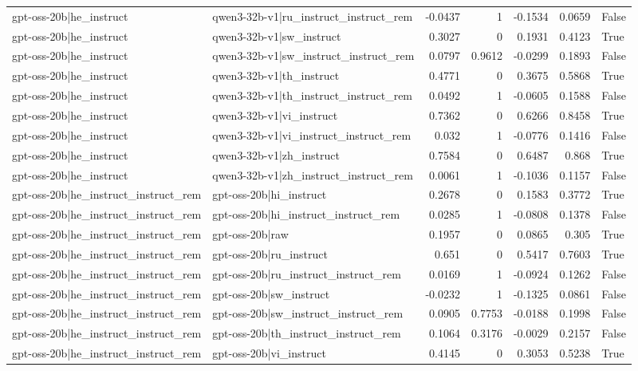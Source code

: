 \begin{table}
\begin{tabular}{l l r r r r l}
gpt-oss-20b|he_instruct & qwen3-32b-v1|ru_instruct_instruct_rem & -0.0437 & 1 & -0.1534 & 0.0659 & False \\
gpt-oss-20b|he_instruct & qwen3-32b-v1|sw_instruct & 0.3027 & 0 & 0.1931 & 0.4123 & True \\
gpt-oss-20b|he_instruct & qwen3-32b-v1|sw_instruct_instruct_rem & 0.0797 & 0.9612 & -0.0299 & 0.1893 & False \\
gpt-oss-20b|he_instruct & qwen3-32b-v1|th_instruct & 0.4771 & 0 & 0.3675 & 0.5868 & True \\
gpt-oss-20b|he_instruct & qwen3-32b-v1|th_instruct_instruct_rem & 0.0492 & 1 & -0.0605 & 0.1588 & False \\
gpt-oss-20b|he_instruct & qwen3-32b-v1|vi_instruct & 0.7362 & 0 & 0.6266 & 0.8458 & True \\
gpt-oss-20b|he_instruct & qwen3-32b-v1|vi_instruct_instruct_rem & 0.032 & 1 & -0.0776 & 0.1416 & False \\
gpt-oss-20b|he_instruct & qwen3-32b-v1|zh_instruct & 0.7584 & 0 & 0.6487 & 0.868 & True \\
gpt-oss-20b|he_instruct & qwen3-32b-v1|zh_instruct_instruct_rem & 0.0061 & 1 & -0.1036 & 0.1157 & False \\
gpt-oss-20b|he_instruct_instruct_rem & gpt-oss-20b|hi_instruct & 0.2678 & 0 & 0.1583 & 0.3772 & True \\
gpt-oss-20b|he_instruct_instruct_rem & gpt-oss-20b|hi_instruct_instruct_rem & 0.0285 & 1 & -0.0808 & 0.1378 & False \\
gpt-oss-20b|he_instruct_instruct_rem & gpt-oss-20b|raw & 0.1957 & 0 & 0.0865 & 0.305 & True \\
gpt-oss-20b|he_instruct_instruct_rem & gpt-oss-20b|ru_instruct & 0.651 & 0 & 0.5417 & 0.7603 & True \\
gpt-oss-20b|he_instruct_instruct_rem & gpt-oss-20b|ru_instruct_instruct_rem & 0.0169 & 1 & -0.0924 & 0.1262 & False \\
gpt-oss-20b|he_instruct_instruct_rem & gpt-oss-20b|sw_instruct & -0.0232 & 1 & -0.1325 & 0.0861 & False \\
gpt-oss-20b|he_instruct_instruct_rem & gpt-oss-20b|sw_instruct_instruct_rem & 0.0905 & 0.7753 & -0.0188 & 0.1998 & False \\
gpt-oss-20b|he_instruct_instruct_rem & gpt-oss-20b|th_instruct_instruct_rem & 0.1064 & 0.3176 & -0.0029 & 0.2157 & False \\
gpt-oss-20b|he_instruct_instruct_rem & gpt-oss-20b|vi_instruct & 0.4145 & 0 & 0.3053 & 0.5238 & True \\

\end{tabular}
\end{table}
